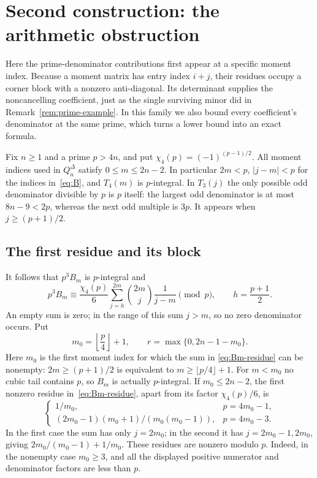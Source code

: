 \documentclass[11pt]{article}
\theoremstyle{definition}
\theoremstyle{remark}
\numberwithin{equation}{section}
\begin{document}
\section{Second construction: the arithmetic obstruction}\label{sec:delta-arithmetic}

Here the prime-denominator contributions first appear at a specific
moment index. Because a moment matrix has entry index $i+j$, their
residues occupy a corner block with a nonzero anti-diagonal. Its
determinant supplies the noncancelling coefficient, just as the single
surviving minor did in Remark~\ref{rem:prime-example}. In this family
we also bound every coefficient's denominator at the same prime, which
turns a lower bound into an exact formula.

Fix $n\geq1$ and a prime $p>4n$, and put
$\chi_4(p)=(-1)^{(p-1)/2}$. All moment indices used in
$Q_n^{\Delta}$ satisfy $0\leq m\leq2n-2$. In particular $2m<p$,
$|j-m|<p$ for the indices in~\eqref{eq:B}, and $T_4(m)$ is $p$-integral.
In $T_3(j)$ the only possible odd denominator divisible by $p$ is $p$
itself: the largest odd denominator is at most $8n-9<2p$, whereas the
next odd multiple is $3p$. It appears when $j\geq(p+1)/2$.

\subsection{The first residue and its block}

It follows that $p^3B_m$ is $p$-integral and
\begin{equation}\label{eq:Bm-residue}
 p^3B_m\equiv\frac{\chi_4(p)}6
  \sum_{j=h}^{2m}\binom{2m}{j}\frac1{j-m}\pmod p,
 \qquad h=\frac{p+1}{2}.
\end{equation}
An empty sum is zero; in the range of this sum $j>m$, so no zero
denominator occurs. Put
\begin{equation}\label{eq:m0-r}
 m_0=\left\lfloor\frac p4\right\rfloor+1,\qquad
 r=\max\{0,2n-1-m_0\}.
\end{equation}
Here $m_0$ is the first moment index for which the sum in
\eqref{eq:Bm-residue} can be nonempty: $2m\geq(p+1)/2$ is
equivalent to $m\geq\lfloor p/4\rfloor+1$.
For $m<m_0$ no cubic tail contains $p$, so $B_m$ is actually $p$-integral.
If $m_0\leq2n-2$, the first nonzero residue in~\eqref{eq:Bm-residue},
apart from its factor $\chi_4(p)/6$, is
\begin{equation}\label{eq:first-residue}
 \begin{cases}
 1/m_0,&p=4m_0-1,\\[2pt]
 (2m_0-1)(m_0+1)/(m_0(m_0-1)),&p=4m_0-3.
 \end{cases}
\end{equation}
In the first case the sum has only $j=2m_0$; in the second it has
$j=2m_0-1,2m_0$, giving $2m_0/(m_0-1)+1/m_0$.
These residues are nonzero modulo $p$. Indeed, in the nonempty case
$m_0\geq3$, and all the displayed positive numerator and denominator
factors are less than $p$.
\end{document}
